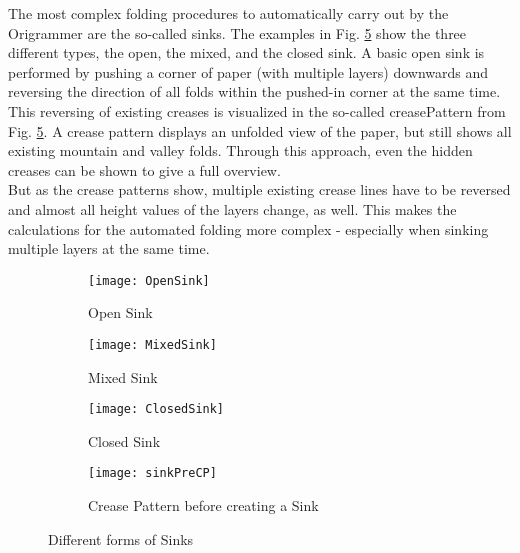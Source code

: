 The most complex folding procedures to automatically carry out by the Origrammer are the so-called sinks. The examples in Fig. \ref{fig:sinks} show the three different types, the open, the mixed, and the closed sink. A basic open sink is performed by pushing a corner of paper (with multiple layers) downwards and reversing the direction of all folds within the pushed-in corner at the same time. This reversing of existing creases is visualized in the so-called \gls{creasePattern} from Fig. \ref{fig:sinks}. A crease pattern displays an unfolded view of the paper, but still shows all existing mountain and valley folds. Through this approach, even the hidden creases can be shown to give a full overview.\\
But as the crease patterns show, multiple existing crease lines have to be reversed and almost all height values of the layers change, as well. This makes the calculations for the automated folding more complex - especially when sinking multiple layers at the same time.
\begin{figure}[htbp]
	\centering
	\begin{subfigure}{\textwidth}
		\texttt{[image: OpenSink]}
		\caption{Open Sink}
		\label{fig:openSink}
	\end{subfigure}
	\begin{subfigure}{\textwidth}
		\texttt{[image: MixedSink]}
		\caption{Mixed Sink}
		\label{fig:mixedSink}
	\end{subfigure}
	\begin{subfigure}{\textwidth}
		\texttt{[image: ClosedSink]}
		\caption{Closed Sink}
		\label{fig:closedSink}
	\end{subfigure}
	\begin{subfigure}{\textwidth}
	        \centering
		\texttt{[image: sinkPreCP]}
		\caption{Crease Pattern before creating a Sink}
		\label{fig:sinkPreCP}
	\end{subfigure}
	\caption[Different forms of Sinks]{Different forms of Sinks\footnotemark}
	\label{fig:sinks}
\end{figure}

